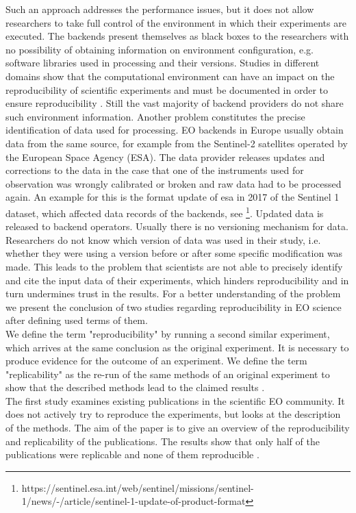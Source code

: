 \documentclass[draft,final]{vutinfth} %
\begin{document}
Such an approach addresses the performance issues, but it does not allow researchers to take full control of the environment in which their experiments are executed. The backends present themselves as black boxes to the researchers with no possibility of obtaining information on environment configuration, e.g. software libraries used in processing and their versions. Studies in different domains show that the computational environment can have an impact on the reproducibility of scientific experiments and must be documented in order to ensure reproducibility \cite{Freesurfer} \cite{Thestateofreproducibility}  \cite{MiksaBiomedical}. Still the vast majority of backend providers do not share such environment information. Another problem constitutes the precise identification of data used for processing. EO backends in Europe usually obtain data from the same source, for example from the Sentinel-2 satellites operated by the European Space Agency (ESA). The data provider releases updates and corrections to the data in the case that one of the instruments used for observation was wrongly calibrated or broken and raw data had to be processed again. An example for this is the format update of \gls{esa} in 2017 of the Sentinel 1 dataset, which affected data records of the backends, see \footnote{https://sentinel.esa.int/web/sentinel/missions/sentinel-1/news/-/article/sentinel-1-update-of-product-format}. Updated data is released to backend operators. Usually there is no versioning mechanism for data. Researchers do not know which version of data was used in their study, i.e. whether they were using a version before or after some specific modification was made. This leads to the problem that scientists are not able to precisely identify and cite the input data of their experiments, which hinders reproducibility and in turn undermines trust in the results. For a better understanding of the problem we present the conclusion of two studies regarding reproducibility in EO science after defining used terms of them. \\
We define the term "reproducibility" by running a second {similar} \gls{experiment}, which arrives at the same conclusion as the original experiment. It is necessary to produce evidence for the outcome of an experiment. We define the term "replicability" as the re-run of the same methods of an original experiment to show that the described methods lead to the claimed results \cite{reprovsrepli}. \\
The first study examines existing publications in the scientific EO community. It does not actively try to reproduce the experiments, but looks at the description of the methods. The aim of the paper is to give an overview of the reproducibility and replicability of the publications. The results show that only half of the publications were replicable and none of them reproducible \cite{Ostermann2017AdvancingSW}. \\
\end{document}
